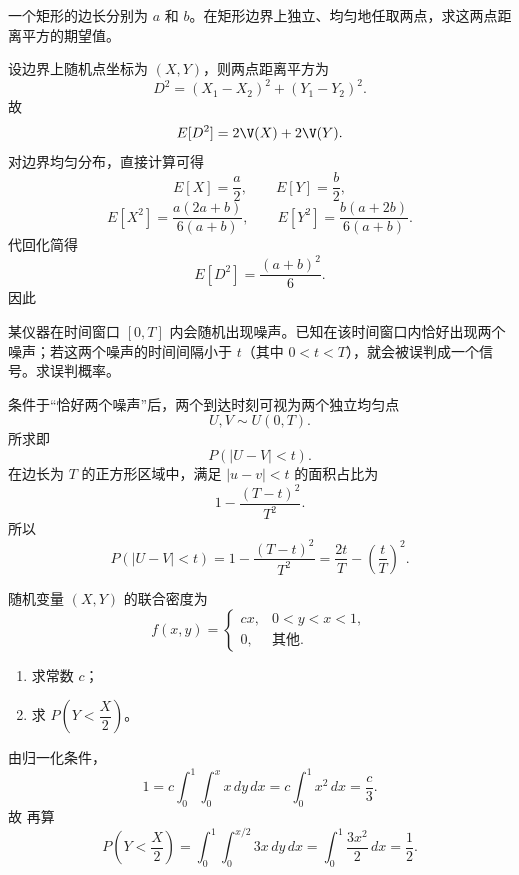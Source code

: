 \begin{question}
一个矩形的边长分别为 $a$ 和 $b$。在矩形边界上独立、均匀地任取两点，求这两点距离平方的期望值。
\begin{solution}
设边界上随机点坐标为 $(X,Y)$，则两点距离平方为
\[
D^2=(X_1-X_2)^2+(Y_1-Y_2)^2.
\]
故
\[
E[D^2]=2\V(X)+2\V(Y).
\]
对边界均匀分布，直接计算可得
\[
E[X]=\frac a2,\qquad E[Y]=\frac b2,
\]
\[
E[X^2]=\frac{a(2a+b)}{6(a+b)},\qquad
E[Y^2]=\frac{b(a+2b)}{6(a+b)}.
\]
代回化简得
\[
E[D^2]=\frac{(a+b)^2}{6}.
\]
因此
\end{solution}
\end{question}

\begin{question}
某仪器在时间窗口 $[0,T]$ 内会随机出现噪声。已知在该时间窗口内恰好出现两个噪声；若这两个噪声的时间间隔小于 $t$（其中 $0<t<T$），就会被误判成一个信号。求误判概率。
\begin{solution}
条件于“恰好两个噪声”后，两个到达时刻可视为两个独立均匀点
\[
U,V\sim U(0,T).
\]
所求即
\[
P(|U-V|<t).
\]
在边长为 $T$ 的正方形区域中，满足 $|u-v|<t$ 的面积占比为
\[
1-\frac{(T-t)^2}{T^2}.
\]
所以
\[
P(|U-V|<t)=1-\frac{(T-t)^2}{T^2}
=\frac{2t}{T}-\left(\frac{t}{T}\right)^2.
\]
\end{solution}
\end{question}

\begin{question}
随机变量 $(X,Y)$ 的联合密度为
\[
f(x,y)=\begin{cases}
cx,&0<y<x<1,\\
0,&\text{其他}.
\end{cases}
\]
\begin{enumerate}
\item 求常数 $c$；
\item 求 $P\!\left(Y<\dfrac{X}{2}\right)$。
\end{enumerate}
\begin{solution}
由归一化条件，
\[
1=c\int_0^1\int_0^x x\,dy\,dx
=c\int_0^1 x^2\,dx
=\frac{c}{3}.
\]
故
再算
\[
P\!\left(Y<\frac X2\right)=\int_0^1\int_0^{x/2}3x\,dy\,dx
=\int_0^1 \frac{3x^2}{2}\,dx
=\frac12.
\]
\end{solution}
\end{question}

